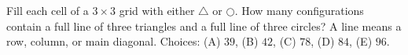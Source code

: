 Fill each cell of a $3\times3$ grid with either $\triangle$ or $\bigcirc$. How many configurations contain a full line of three triangles and a full line of three circles? A line means a row, column, or main diagonal. Choices: (A) $39$, (B) $42$, (C) $78$, (D) $84$, (E) $96$.
